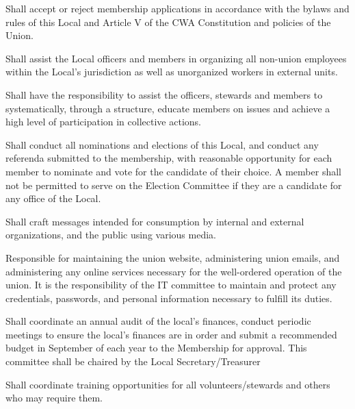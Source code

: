 \documentclass[11pt]{article}
\begin{document}
\begin{description}[labelwidth=\linewidth, listparindent=0pt]
\item[Membership Committee]
Shall accept or reject membership applications in accordance with the bylaws and rules of this Local and Article V of the CWA Constitution and policies of the Union.

\item[Organizing Committee]
Shall assist the Local officers and members in organizing all non-union employees within the Local's jurisdiction as well as unorganized workers in external units.
\item[Mobilization Committee]
Shall have the responsibility to assist the officers, stewards and members to systematically, through a structure, educate members on issues and achieve a high level of participation in collective actions.

\item[Election Committee]
Shall conduct all nominations and elections of this Local, and conduct any referenda submitted to the membership,  with reasonable opportunity for each member to nominate and vote for the candidate of their choice. A member shall not be permitted to serve on the Election Committee if they are a candidate for any office of the Local.

\item[Communications Committee]
  Shall craft messages intended for consumption by internal and external organizations, and the public using various media.

\item[IT Committee]
Responsible for maintaining the union website, administering union emails, and administering any online services necessary for the well-ordered operation of the union. It is the responsibility of the IT committee to maintain and protect any credentials, passwords, and personal information necessary to fulfill its duties.

\item[Finance Committee]

Shall coordinate an annual audit of the local’s finances, conduct periodic meetings to ensure the local’s finances are in order and submit a recommended budget in September of each year to the Membership for approval. This committee shall be chaired by the Local Secretary/Treasurer

\item[Education Committee]
Shall coordinate training opportunities for all volunteers/stewards and others who may require them.


\end{description}
\end{document}
